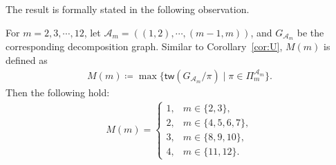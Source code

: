 \documentclass[twoside,11pt]{article}
\newcommand{\partition}{\Pi}
\newcommand{\partitionp}[1]{\partition_{#1}}
\newcommand{\treewidthp}[1]{\mathsf{tw}(#1)}
\def\calA{\mathcal{A}}
\begin{document}
The result is formally stated in the following observation. 
\begin{observation}
\label{obs:HOIF}    
    For $m = 2,3,\cdots, 12$, let $\calA_{m} = ((1,2),\cdots,(m-1,m))$, and $G_{\calA_m}$ be the corresponding decomposition graph. Similar to Corollary~\ref{cor:U}, $M(m)$ is defined as 
    \begin{align*}
        M(m) \coloneqq \max \{ \treewidthp{G_{\calA_m} /\pi} \mid \pi \in \partitionp{m}^{\calA_m}\}. 
    \end{align*}
    Then the following hold:
    \begin{equation}
    \label{HOIF_M}
    \begin{split}
    M (m) = \left\{ \begin{array}{ll}
    1, & m \in \{2, 3\}, \\
    2, & m \in \{4, 5, 6, 7\}, \\
    3, & m \in \{8, 9, 10\}, \\
    4, & m \in \{11, 12\}.
    \end{array} \right.
    \end{split}
    \end{equation}
\end{observation}
\end{document}
